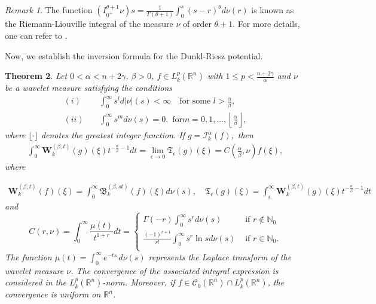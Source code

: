 \documentclass[11pt,a4paper,reqno]{amsproc}
\newtheorem{theorem}{Theorem}[section]
\theoremstyle{definition}
\theoremstyle{remark}
\newtheorem{remark}[theorem]{Remark}
\numberwithin{equation}{section}
\begin{document}
\begin{remark}
  The function $(I_{0^+}^{\theta+1}\nu)s=\frac{1}{\Gamma(\theta+1)}\int_0^s (s-r)^\theta d\nu(r)$ is known as the Riemann-Liouville integral of the measure $\nu$ of order $\theta+1$. For more details, one can refer to  \cite{Oldham}.
\end{remark}
Now, we establish the inversion formula for the Dunkl-Riesz potential. 
\begin{theorem} \label{Inversion-Riesz}
     Let $0< \alpha < n+2\gamma$, $\beta >0 $, $f\in L_k^p(\mathbb{R}^n)$ with $1\leq p < \frac{n+2\gamma}{\alpha}$ 
      and $\nu$ be a wavelet measure satisfying the conditions 
      \begin{align*}
          (i)\quad & \int_0^\infty s^{l}d|\nu|(s) < \infty \quad \text{for some }  l > \frac{\alpha}{\beta}, \\
          (ii)\quad  & \int_0^\infty s^m d\nu(s) = 0, \text{ 
 for} m = 0, 1, \ldots, \left\lfloor \frac{\alpha}{\beta} \right\rfloor,
\end{align*}
where \( \lfloor \cdot \rfloor \) denotes the greatest integer function.
     If $g=\mathcal{I}_k^\alpha (f),$ then 
     \begin{align*}
     \int_0^\infty  \mathbf{W}_k^{(\beta,t)}(g)(\xi) t^{-\frac{\alpha}{\beta}-1}dt = \lim_{\epsilon\longrightarrow  0}
       \mathfrak{T}_\epsilon (g)(\xi) =  C\left(\frac{\alpha}{\beta}, \nu\right)f(\xi),
     \end{align*} where 

\begin{align*}
       \mathbf{W}_k^{(\beta,t)} (f)(\xi) = \int_0^\infty  \mathfrak{B}_k^{(\beta, st)}(f)(\xi) d\nu(s),\quad 
   \mathfrak{T}_\epsilon (g)(\xi) = \int_\epsilon^\infty  \mathbf{W}_k^{(\beta,t)}(g)(\xi) t^{-\frac{\alpha}{\beta}-1}dt
\end{align*} and 
\[ 
C(r,\nu) = \int_0^{\infty} \frac{\mu(t)}{t^{1+r}}dt =  
\begin{cases} 
  \Gamma(-r)\int_0^{\infty}s^{r}d\nu(s) & \text{ if } r \notin \mathbb{N}_0 \\ 
  \frac{(-1)^{r+1}}{r !} \int_0^{\infty}s^{r} \ln{s}d\nu(s) & \text{ if } r \in \mathbb{N}_0. \\  
\end{cases} 
\] 
The function \( \mu(t) = \int_0^{\infty} e^{-ts} \, d\nu(s) \) represents the Laplace transform of the wavelet measure \( \nu \). The convergence of the associated integral expression is considered in the  \( L_k^p(\mathbb{R}^n) \)-norm. Moreover, if \( f \in \mathcal{C}_0(\mathbb{R}^n) \cap L_k^p(\mathbb{R}^n) \), the convergence is uniform on \( \mathbb{R}^n \).
\end{theorem}
\end{document}
